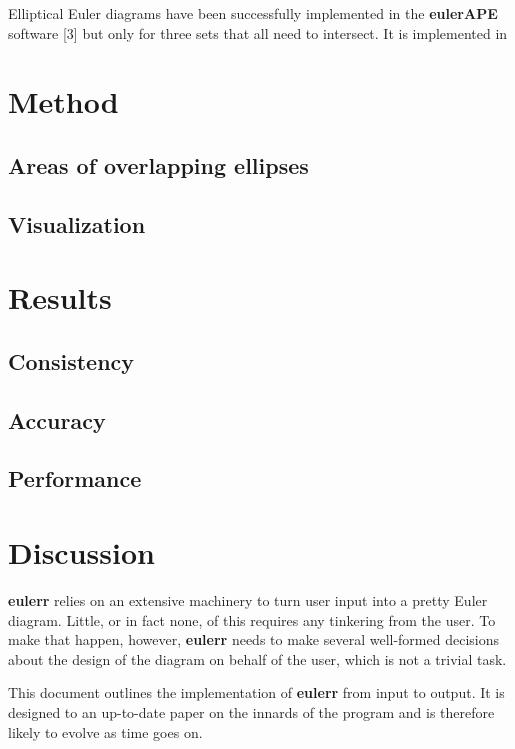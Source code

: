 \documentclass[
  headsepline=true,headings=standardclasses%
]{scrartcl}
\theoremstyle{definition}
\theoremstyle{definition}
\theoremstyle{remark}
\begin{document}
Elliptical Euler diagrams have been successfully implemented in the
\textbf{eulerAPE} software {[}3{]} but only for three sets that all need
to intersect. It is implemented in

\section{Method}\label{method}

\subsection{Areas of overlapping
ellipses}\label{areas-of-overlapping-ellipses}

\subsection{Visualization}\label{visualization}

\section{Results}\label{results}

\subsection{Consistency}\label{consistency}

\subsection{Accuracy}\label{accuracy}

\subsection{Performance}\label{performance}

\section{Discussion}\label{discussion}

\textbf{eulerr} relies on an extensive machinery to turn user input into
a pretty Euler diagram. Little, or in fact none, of this requires any
tinkering from the user. To make that happen, however, \textbf{eulerr}
needs to make several well-formed decisions about the design of the
diagram on behalf of the user, which is not a trivial task.

This document outlines the implementation of \textbf{eulerr} from input
to output. It is designed to an up-to-date paper on the innards of the
program and is therefore likely to evolve as time goes on.
\end{document}
